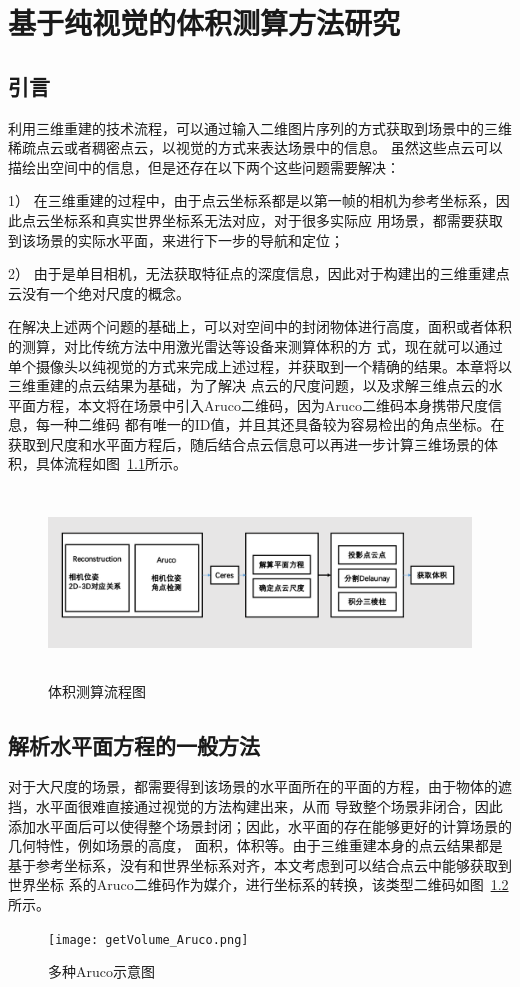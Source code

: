 \chapter{基于纯视觉的体积测算方法研究}
\label{cha:chap4}
\section{引言}
\label{sec:4.1}
利用三维重建的技术流程，可以通过输入二维图片序列的方式获取到场景中的三维稀疏点云或者稠密点云，以视觉的方式来表达场景中的信息。
虽然这些点云可以描绘出空间中的信息，但是还存在以下两个这些问题需要解决：

1）	在三维重建的过程中，由于点云坐标系都是以第一帧的相机为参考坐标系，因此点云坐标系和真实世界坐标系无法对应，对于很多实际应
用场景，都需要获取到该场景的实际水平面，来进行下一步的导航和定位；

2）	由于是单目相机，无法获取特征点的深度信息，因此对于构建出的三维重建点云没有一个绝对尺度的概念。

在解决上述两个问题的基础上，可以对空间中的封闭物体进行高度，面积或者体积的测算，对比传统方法中用激光雷达等设备来测算体积的方
式，现在就可以通过单个摄像头以纯视觉的方式来完成上述过程，并获取到一个精确的结果。本章将以三维重建的点云结果为基础，为了解决
点云的尺度问题，以及求解三维点云的水平面方程，本文将在场景中引入Aruco二维码，因为Aruco二维码本身携带尺度信息，每一种二维码
都有唯一的ID值，并且其还具备较为容易检出的角点坐标。在获取到尺度和水平面方程后，随后结合点云信息可以再进一步计算三维场景的体
积，具体流程如图~\ref{fig:getVolume}所示。

\begin{figure}[H] %
    \centering
    \includegraphics[height=5cm]{getVolume.png}
    \caption{体积测算流程图}
    \label{fig:getVolume}
  \end{figure}

\section{解析水平面方程的一般方法}
\label{sec:4.2}
对于大尺度的场景，都需要得到该场景的水平面所在的平面的方程，由于物体的遮挡，水平面很难直接通过视觉的方法构建出来，从而
导致整个场景非闭合，因此添加水平面后可以使得整个场景封闭；因此，水平面的存在能够更好的计算场景的几何特性，例如场景的高度，
面积，体积等。由于三维重建本身的点云结果都是基于参考坐标系，没有和世界坐标系对齐，本文考虑到可以结合点云中能够获取到世界坐标
系的Aruco二维码作为媒介，进行坐标系的转换，该类型二维码如图~\ref{fig:getVolume_Aruco}所示。
\begin{figure}[H] %
  \centering
  \texttt{[image: getVolume\_Aruco.png]}
  \caption{多种Aruco示意图}
  \label{fig:getVolume_Aruco}
  \end{figure}
